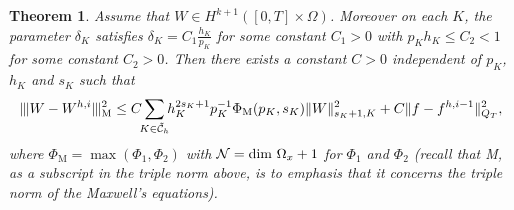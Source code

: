 \documentclass[reqno,a4paper]{amsart}
\newtheorem{theorem}{Theorem}[section]
\theoremstyle{remark}
\numberwithin{equation}{section}
\newcommand{\Mnorm}[1]{|\mkern-1mu|\mkern-1mu|#1|\mkern-1mu|\mkern-1mu|_\mathrm{M}}
\def\sumK{\sum_{K\in\mathcal{\tilde{C}}_h}\!\!}
\begin{document}
\begin{theorem} \label{maxbigthe}
Assume that $W\in H^{k+1}([0,T] \times \Omega)$. Moreover
on each $K$, the parameter $\delta_K$ satisfies 
$\delta_K=C_1\frac{h_K}{p_K}$
for some constant $C_1>0$ with $p_Kh_K\leq C_2<1$ for some constant $C_2>0$.
Then there exists a constant $C>0$ independent of $p_K$, $h_K$ and $s_K$ such that
\[ 
\Mnorm{W-W^{h,i}}^2 \leq
C\!\!\sumK h_K^{2s_K+1}p_K^{-1}\Phi_{\mathrm{M}}(p_K,s_K)\|W\|^2_{s_K+1,K}\\
+ C \| f-f^{h,i-1} \|^2_{Q_T},
\]
where $\Phi_{\mathrm{M}} = \max(\Phi_1, \Phi_2) $ 
with $\mathcal{N}=\textnormal{dim } \Omega_x +1$ for $ \Phi_1 $ and $ \Phi_2 $
(recall that \textnormal{M}, as a subscript in the triple norm above, 
is to emphasis that it concerns the triple norm of the Maxwell's equations). 
\end{theorem}
\end{document}

